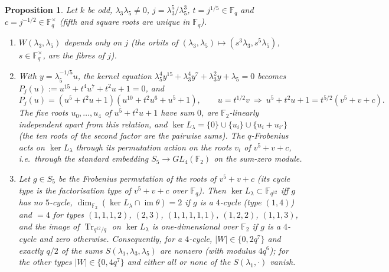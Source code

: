 \documentclass[11pt,a4paper]{amsart}
\newtheorem{proposition}[theorem]{Proposition}
\theoremstyle{definition}
\newcommand{\F}{\mathbb{F}}
\newcommand{\Tr}{\operatorname{Tr}}
\newcommand{\im}{\operatorname{im}}
\begin{document}
\begin{proposition}\label{prop:mixed}
Let $k$ be odd, $\lambda_3\lambda_5\ne0$, $j=\lambda_3^5/\lambda_5^3$, $t=j^{1/5}\in\F_q$ and $c=j^{-1/2}\in\F_q^\times$ (fifth and square roots are unique in $\F_q$).
\begin{enumerate}[label=\textup{(\alph*)},leftmargin=2em]
\item $W(\lambda_3,\lambda_5)$ depends only on $j$ (the orbits of $(\lambda_3,\lambda_5)\mapsto(s^3\lambda_3,s^5\lambda_5)$, $s\in\F_q^\times$, are the fibres of $j$).
\item With $y=\lambda_5^{-1/5}u$, the kernel equation $\lambda_5^4y^{15}+\lambda_3^4y^7+\lambda_3^2y+\lambda_5=0$ becomes $P_j(u):=u^{15}+t^4u^7+t^2u+1=0$, and
\[
P_j(u)=(u^5+t^2u+1)(u^{10}+t^2u^6+u^5+1),\qquad u=t^{1/2}v\ \Longrightarrow\ u^5+t^2u+1=t^{5/2}(v^5+v+c).
\]
The five roots $u_0,\dots,u_4$ of $u^5+t^2u+1$ have sum $0$, are $\F_2$-linearly independent apart from this relation, and $\ker L_\lambda=\{0\}\cup\{u_i\}\cup\{u_i+u_{i'}\}$ (the ten roots of the second factor are the pairwise sums). The $q$-Frobenius acts on $\ker L_\lambda$ through its permutation action on the roots $v_i$ of $v^5+v+c$, i.e.\ through the standard embedding $S_5\to GL_4(\F_2)$ on the sum-zero module.
\item Let $g\in S_5$ be the Frobenius permutation of the roots of $v^5+v+c$ (its cycle type is the factorisation type of $v^5+v+c$ over $\F_q$). Then $\ker L_\lambda\subset\F_{q^{12}}$ iff $g$ has no $5$-cycle, $\dim_{\F_2}(\ker L_\lambda\cap\im\theta)=2$ if $g$ is a $4$-cycle (type $(1,4)$) and $=4$ for types $(1,1,1,2)$, $(2,3)$, $(1,1,1,1,1)$, $(1,2,2)$, $(1,1,3)$, and the image of $\Tr_{q^{12}/q}$ on $\ker L_\lambda$ is one-dimensional over $\F_2$ if $g$ is a $4$-cycle and zero otherwise. Consequently, for a $4$-cycle, $|W|\in\{0,2q^7\}$ and exactly $q/2$ of the sums $S(\lambda_1,\lambda_3,\lambda_5)$ are nonzero (with modulus $4q^6$); for the other types $|W|\in\{0,4q^7\}$ and either all or none of the $S(\lambda_1,\cdot)$ vanish.
\end{enumerate}
\end{proposition}
\end{document}
